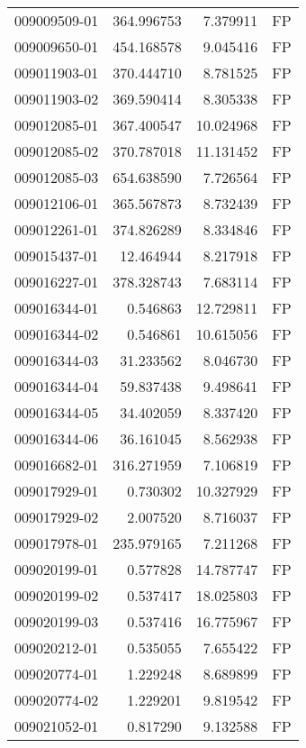 \begin{tabular}{lrrl}
009009509-01 &  364.996753 &       7.379911 &   FP \\
009009650-01 &  454.168578 &       9.045416 &   FP \\
009011903-01 &  370.444710 &       8.781525 &   FP \\
009011903-02 &  369.590414 &       8.305338 &   FP \\
009012085-01 &  367.400547 &      10.024968 &   FP \\
009012085-02 &  370.787018 &      11.131452 &   FP \\
009012085-03 &  654.638590 &       7.726564 &   FP \\
009012106-01 &  365.567873 &       8.732439 &   FP \\
009012261-01 &  374.826289 &       8.334846 &   FP \\
009015437-01 &   12.464944 &       8.217918 &   FP \\
009016227-01 &  378.328743 &       7.683114 &   FP \\
009016344-01 &    0.546863 &      12.729811 &   FP \\
009016344-02 &    0.546861 &      10.615056 &   FP \\
009016344-03 &   31.233562 &       8.046730 &   FP \\
009016344-04 &   59.837438 &       9.498641 &   FP \\
009016344-05 &   34.402059 &       8.337420 &   FP \\
009016344-06 &   36.161045 &       8.562938 &   FP \\
009016682-01 &  316.271959 &       7.106819 &   FP \\
009017929-01 &    0.730302 &      10.327929 &   FP \\
009017929-02 &    2.007520 &       8.716037 &   FP \\
009017978-01 &  235.979165 &       7.211268 &   FP \\
009020199-01 &    0.577828 &      14.787747 &   FP \\
009020199-02 &    0.537417 &      18.025803 &   FP \\
009020199-03 &    0.537416 &      16.775967 &   FP \\
009020212-01 &    0.535055 &       7.655422 &   FP \\
009020774-01 &    1.229248 &       8.689899 &   FP \\
009020774-02 &    1.229201 &       9.819542 &   FP \\
009021052-01 &    0.817290 &       9.132588 &   FP \\

\end{tabular}
